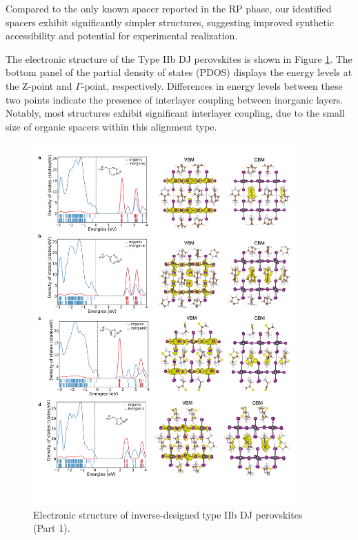 Compared to the only known spacer reported in the RP phase, our identified spacers exhibit significantly simpler structures, suggesting improved synthetic accessibility and potential for experimental realization.

The electronic structure of the Type IIb DJ perovskites is shown in Figure \ref{fig:figure5.25}. The bottom panel of the partial density of states (PDOS) displays the energy levels at the Z-point and $\Gamma$-point, respectively. Differences in energy levels between these two points indicate the presence of interlayer coupling between inorganic layers. Notably, most structures exhibit significant interlayer coupling, due to the small size of organic spacers within this alignment type.

\begin{figure}[htbp]
    \centering
    \includegraphics[width=0.9\textwidth]{figures/synthesis-feasibility/figure5-25-1.png}
    \caption{Electronic structure of inverse-designed type IIb DJ perovskites (Part 1).}
    \label{fig:figure5.25}
\end{figure}

